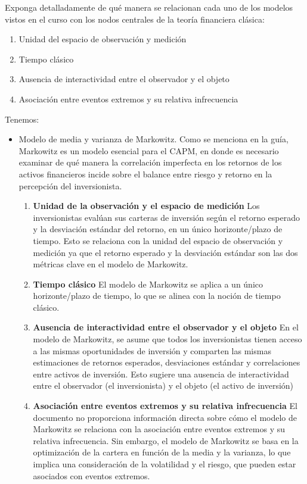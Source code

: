 \begin{problema}
    Exponga detalladamente de qué manera se relacionan cada uno de los modelos vistos en el curso con los nodos centrales de la teoría financiera clásica:
\begin{enumerate}
    \item Unidad del espacio de observación y medición
    \item Tiempo clásico
    \item Ausencia de interactividad entre el observador y el objeto
    \item Asociación entre eventos extremos y su relativa infrecuencia
\end{enumerate}

\begin{sol}
    Tenemos: 
    \begin{itemize}
        \item Modelo de media y varianza de Markowitz.  Como se menciona en la guía, Markowitz es un modelo esencial para el CAPM, en donde es necesario examinar de qué manera la correlación imperfecta en los retornos de los activos financieros incide sobre el balance entre riesgo y retorno en la percepción del inversionista. 
        \begin{enumerate}
        \item \textbf{Unidad de la observación y el espacio de medición} Los inversionistas evalúan sus carteras de inversión según el retorno esperado y la desviación estándar del retorno, en un único horizonte/plazo de tiempo. Esto se relaciona con la unidad del espacio de observación y medición ya que el retorno esperado y la desviación estándar son las dos métricas clave en el modelo de Markowitz.
        \item \textbf{Tiempo clásico}
        El modelo de Markowitz se aplica a un único horizonte/plazo de tiempo, lo que se alinea con la noción de tiempo clásico.
        \item \textbf{Ausencia de interactividad entre el observador y el objeto}
        En el modelo de Markowitz, se asume que todos los inversionistas tienen acceso a las mismas oportunidades de inversión y comparten las mismas estimaciones de retornos esperados, desviaciones estándar y correlaciones entre activos de inversión. Esto sugiere una ausencia de interactividad entre el observador (el inversionista) y el objeto (el activo de inversión) 
        \item \textbf{Asociación entre eventos extremos y su relativa infrecuencia}
        El documento no proporciona información directa sobre cómo el modelo de Markowitz se relaciona con la asociación entre eventos extremos y su relativa infrecuencia. Sin embargo, el modelo de Markowitz se basa en la optimización de la cartera en función de la media y la varianza, lo que implica una consideración de la volatilidad y el riesgo, que pueden estar asociados con eventos extremos.

\end{enumerate}
\end{itemize}
\end{sol}
\end{problema}
